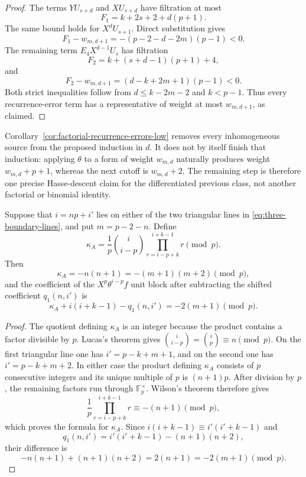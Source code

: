 \begin{proof}
The terms $YU_{s+d}$ and $XU_{s+d}$ have filtration at most
\[
 F_1=k+2s+2+d(p+1).
\]
The same bound holds for $X^dU_{s+1}$.  Direct substitution gives
\[
 F_1-w_{m,d+1}=-(p-2-d-2m)(p-1)<0.
\]
The remaining term $E_4X^{d-1}U_s$ has filtration
\[
 F_2=k+(s+d-1)(p+1)+4,
\]
and
\[
 F_2-w_{m,d+1}=(d-k+2m+1)(p-1)<0.
\]
Both strict inequalities follow from $d\leq k-2m-2$ and $k<p-1$.
Thus every recurrence-error term has a representative of weight at most
$w_{m,d+1}$, as claimed.
\end{proof}

Corollary~\ref{cor:factorial-recurrence-errors-low} removes every
inhomogeneous source from the proposed induction in $d$.  It does not by
itself finish that induction: applying $\theta$ to a form of weight
$w_{m,d}$ naturally produces weight $w_{m,d}+p+1$, whereas the next cutoff
is $w_{m,d}+2$.  The remaining step is therefore one precise Hasse-descent
claim for the differentiated previous class, not another factorial or
binomial identity.

\begin{lemma}
\label{lem:unit-block-endpoint}
Suppose that $i=np+i'$ lies on either of the two triangular lines in
\eqref{eq:three-boundary-lines}, and put $m=p-2-n$.  Define
\[
 \kappa_A
 =\frac1p\binom{i}{i-p}
   \prod_{r=i-p+k}^{i+k-1}r\pmod p.
\]
Then
\[
 \kappa_A=-n(n+1)=-(m+1)(m+2)\pmod p,
\]
and the coefficient of the $X^p\theta^{i-p}f$ unit block after subtracting
the shifted coefficient $q_1(n,i')$ is
\begin{equation}\label{eq:unit-minus-shifted}
 \kappa_A+i(i+k-1)-q_1(n,i')=-2(m+1)\pmod p.
\end{equation}
\end{lemma}

\begin{proof}
The quotient defining $\kappa_A$ is an integer because the product
contains a factor divisible by $p$.  Lucas's theorem gives
$\binom{i}{i-p}=\binom{i}{p}\equiv n\pmod p$.  On the first triangular
line one has $i'=p-k+m+1$, and on the second one has
$i'=p-k+m+2$.  In either case the product defining $\kappa_A$ consists
of $p$ consecutive integers and its unique multiple of $p$ is
$(n+1)p$.  After division by $p$, the remaining factors run through
$\mathbb F_p^\times$.  Wilson's theorem therefore gives
\[
 \frac1p\prod_{r=i-p+k}^{i+k-1}r
 \equiv -(n+1)\pmod p,
\]
which proves the formula for $\kappa_A$.  Since
$i(i+k-1)\equiv i'(i'+k-1)$ and
\[
 q_1(n,i')=i'(i'+k-1)-(n+1)(n+2),
\]
their difference is
\[
 -n(n+1)+(n+1)(n+2)=2(n+1)=-2(m+1)\pmod p.
\]
\end{proof}

